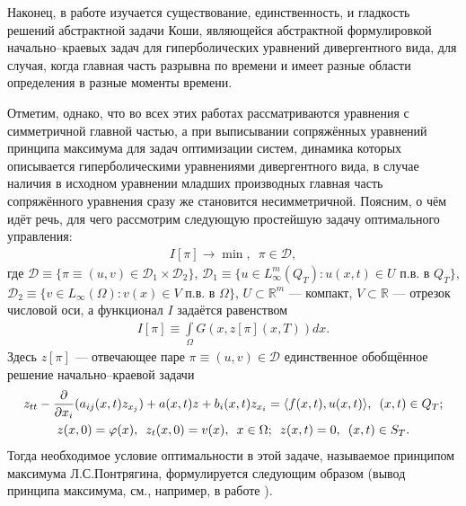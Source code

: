 \documentclass{report}
\begin{document}
Наконец, в работе \cite{Lomovcev} изучается существование, единственность, и гладкость решений абстрактной задачи Коши, являющейся абстрактной формулировкой начально--краевых задач для
гиперболических уравнений дивергентного вида, для случая, когда главная часть разрывна по времени и имеет разные области определения в разные моменты времени.

Отметим, однако, что во всех этих работах рассматриваются уравнения с симметричной главной частью, а при выписывании сопряжённых уравнений принципа максимума для задач оптимизации систем,
динамика которых описывается гиперболическими уравнениями дивергентного вида, в случае наличия в исходном уравнении младших производных главная часть сопряжённого уравнения сразу же
становится несимметричной. Поясним, о чём идёт речь, для чего рассмотрим следующую простейшую задачу оптимального управления:
\begin{gather}\label{Primitive.OptControl}
I[\pi]\to\min,\,\,\,\pi\in\mathcal{D},
\end{gather}
где $\mathcal{D}\equiv\{\pi\equiv(u,v)\in\mathcal{D}_1\times\mathcal{D}_2\}$, $\mathcal{D}_1\equiv\{u\in L_\infty^m(Q_T):u(x,t)\in U\text{ п.в. в $Q_T$}\}$, $\mathcal{D}_2\equiv\{v\in
L_\infty(\Omega):v(x)\in V\text{ п.в. в $\Omega$}\}$, $U\subset \mathbb{R}^m$ --- компакт, $V\subset\mathbb{R}$ --- отрезок числовой оси, а функционал $I$ задаётся равенством
\begin{gather*}
I[\pi]\equiv\int\limits_\Omega G(x,z[\pi](x,T))dx.
\end{gather*}
Здесь $z[\pi]$ --- отвечающее паре $\pi\equiv(u,v)\in\mathcal{D}$ единственное обобщённое решение начально--краевой задачи
\begin{gather}\label{Primitive.OptControl!main.eq}
z_{tt}-\frac{\partial}{\partial x_i}(a_{ij}(x,t)z_{x_j})+a(x,t)z+b_i(x,t)z_{x_i}=\langle f(x,t),u(x,t)\rangle,\,\,\,(x,t)\in Q_T;\\
\notag z(x,0)=\varphi(x),\,\,\,z_t(x,0)=v(x),\,\,\,x\in\Omega;\,\,\,z(x,t)=0,\,\,\,(x,t)\in S_T.
\end{gather}
Тогда необходимое условие оптимальности в этой задаче, называемое принципом максимума Л.С.Понтрягина, формулируется следующим образом (вывод принципа максимума, см., например, в работе
\cite{variation_2008}).
\end{document}
